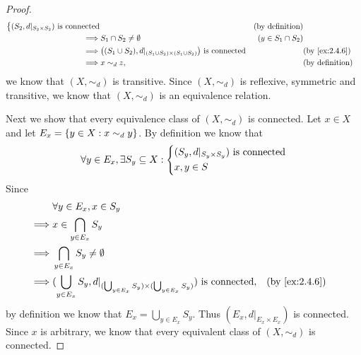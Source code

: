 \begin{proof}
\begin{align*}
\begin{dcases}
                                                (S_2, d|_{S_2 \times S_2}) \text{ is connected}
                                              \end{dcases}                                       &                      & \text{(by definition)}        \\
    \implies & S_1 \cap S_2 \neq \emptyset                                                              & (y \in S_1 \cap S_2)                          \\
    \implies & \big((S_1 \cup S_2), d|_{(S_1 \cup S_2) \times (S_1 \cup S_2)}\big) \text{ is connected} &                      & \by{ex:2.4.6}          \\
    \implies & x \sim_d z,                                                                              &                      & \text{(by definition)}
  \end{align*}
  we know that \((X, \sim_d)\) is transitive.
  Since \((X, \sim_d)\) is reflexive, symmetric and transitive, we know that \((X, \sim_d)\) is an equivalence relation.

  Next we show that every equivalence class of \((X, \sim_d)\) is connected.
  Let \(x \in X\) and let \(E_x = \left\lbrace y \in X : x \sim_d y\right\rbrace\).
  By definition we know that
  \[
    \forall y \in E_x, \exists S_y \subseteq X : \begin{dcases}
      (S_y, d|_{S_y \times S_y}) \text{ is connected} \\
      x, y \in S
    \end{dcases}
  \]
  Since
  \begin{align*}
             & \forall y \in E_x, x \in S_y                                                                                                        \\
    \implies & x \in \bigcap_{y \in E_x} S_y                                                                                                       \\
    \implies & \bigcap_{y \in E_x} S_y \neq \emptyset                                                                                              \\
    \implies & (\bigcup_{y \in E_x} S_y, d|_{(\bigcup_{y \in E_x} S_y) \times (\bigcup_{y \in E_x} S_y)}) \text{ is connected}, &  & \by{ex:2.4.6}
  \end{align*}
  by definition we know that \(E_x = \bigcup_{y \in E_x} S_y\).
  Thus \((E_x, d|_{E_x \times E_x})\) is connected.
  Since \(x\) is arbitrary, we know that every equivalent class of \((X, \sim_d)\) is connected.


\end{proof}
